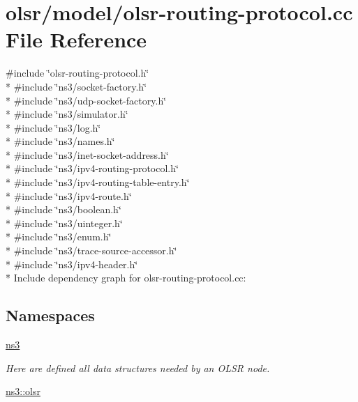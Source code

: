 \hypertarget{olsr-routing-protocol_8cc}{}\section{olsr/model/olsr-\/routing-\/protocol.cc File Reference}
\label{olsr-routing-protocol_8cc}
{\ttfamily \#include \char`\"{}olsr-\/routing-\/protocol.\+h\char`\"{}}\\*
{\ttfamily \#include \char`\"{}ns3/socket-\/factory.\+h\char`\"{}}\\*
{\ttfamily \#include \char`\"{}ns3/udp-\/socket-\/factory.\+h\char`\"{}}\\*
{\ttfamily \#include \char`\"{}ns3/simulator.\+h\char`\"{}}\\*
{\ttfamily \#include \char`\"{}ns3/log.\+h\char`\"{}}\\*
{\ttfamily \#include \char`\"{}ns3/names.\+h\char`\"{}}\\*
{\ttfamily \#include \char`\"{}ns3/inet-\/socket-\/address.\+h\char`\"{}}\\*
{\ttfamily \#include \char`\"{}ns3/ipv4-\/routing-\/protocol.\+h\char`\"{}}\\*
{\ttfamily \#include \char`\"{}ns3/ipv4-\/routing-\/table-\/entry.\+h\char`\"{}}\\*
{\ttfamily \#include \char`\"{}ns3/ipv4-\/route.\+h\char`\"{}}\\*
{\ttfamily \#include \char`\"{}ns3/boolean.\+h\char`\"{}}\\*
{\ttfamily \#include \char`\"{}ns3/uinteger.\+h\char`\"{}}\\*
{\ttfamily \#include \char`\"{}ns3/enum.\+h\char`\"{}}\\*
{\ttfamily \#include \char`\"{}ns3/trace-\/source-\/accessor.\+h\char`\"{}}\\*
{\ttfamily \#include \char`\"{}ns3/ipv4-\/header.\+h\char`\"{}}\\*
Include dependency graph for olsr-\/routing-\/protocol.cc\+:
\subsection*{Namespaces}
\begin{DoxyCompactItemize}
\item 
 \hyperlink{namespacens3}{ns3}
\begin{DoxyCompactList}\small\item\em Here are defined all data structures needed by an O\+L\+SR node. \end{DoxyCompactList}\item 
 \hyperlink{namespacens3_1_1olsr}{ns3\+::olsr}
\end{DoxyCompactItemize}
